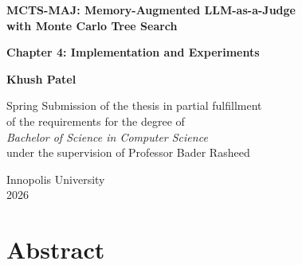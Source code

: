 \documentclass[12pt,a4paper]{report}
\begin{document}
\begin{titlepage}
\begin{center}
\vspace*{3cm}

{\LARGE \textbf{MCTS-MAJ: Memory-Augmented LLM-as-a-Judge\\ with Monte Carlo Tree Search}}

\vspace{1.5cm}

{\Large \textbf{Chapter 4: Implementation and Experiments}}

\vspace{2cm}

{\large \textbf{Khush Patel}}

\vspace{1.5cm}

Spring Submission of the thesis in partial fulfillment\\
of the requirements for the degree of\\
\textit{Bachelor of Science in Computer Science}\\[0.5cm]
under the supervision of Professor Bader Rasheed

\vfill

Innopolis University\\
2026

\end{center}
\end{titlepage}

\chapter*{Abstract}
\end{document}

